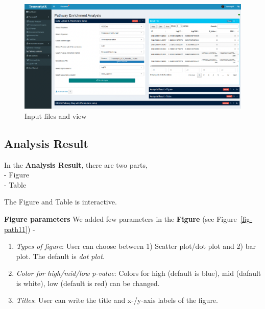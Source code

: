 \documentclass[
  a4paper,
  oneside,
  open=any]{scrreport}
\begin{document}
\begin{figure}[H]

{\centering \includegraphics{./images/pathway/path1.png}

}

\caption{\label{fig-path1}Input files and view}

\end{figure}

\hypertarget{analysis-result-4}{%
\subsection{Analysis Result}\label{analysis-result-4}}

In the \textbf{Analysis Result}, there are two parts,\\
- Figure\\
- Table

The Figure and Table is interactive.

\textbf{Figure parameters} We added few parameters in the
\textbf{Figure} (see Figure~\ref{fig-path11}) -

\begin{enumerate}
\def\labelenumi{\arabic{enumi}.}
\item
  \emph{Types of figure}: User can choose between 1) Scatter plot/dot
  plot and 2) bar plot. The default is \emph{dot plot}.
\item
  \emph{Color for high/mid/low p-value}: Colors for high (default is
  blue), mid (dafault is white), low (default is red) can be changed.
\item
  \emph{Titles}: User can write the title and x-/y-axis labels of the
  figure.
\end{enumerate}
\end{document}
